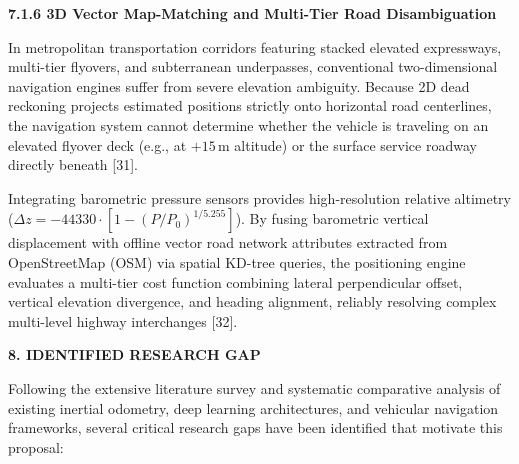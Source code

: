 \documentclass[11pt,a4paper]{article}
\begin{document}
\textbf{7.1.6 3D Vector Map-Matching and Multi-Tier Road Disambiguation}

In metropolitan transportation corridors featuring stacked elevated expressways, multi-tier flyovers, and subterranean underpasses, conventional two-dimensional navigation engines suffer from severe elevation ambiguity. Because 2D dead reckoning projects estimated positions strictly onto horizontal road centerlines, the navigation system cannot determine whether the vehicle is traveling on an elevated flyover deck (e.g., at $+15\,\text{m}$ altitude) or the surface service roadway directly beneath [31].

Integrating barometric pressure sensors provides high-resolution relative altimetry ($\Delta z = -44330 \cdot [1 - (P/P_0)^{1/5.255}]$). By fusing barometric vertical displacement with offline vector road network attributes extracted from OpenStreetMap (OSM) via spatial KD-tree queries, the positioning engine evaluates a multi-tier cost function combining lateral perpendicular offset, vertical elevation divergence, and heading alignment, reliably resolving complex multi-level highway interchanges [32].

\vspace{0.3cm}
\begin{center}
{\large \textbf{8. IDENTIFIED RESEARCH GAP}}
\end{center}

Following the extensive literature survey and systematic comparative analysis of existing inertial odometry, deep learning architectures, and vehicular navigation frameworks, several critical research gaps have been identified that motivate this proposal:
\end{document}
